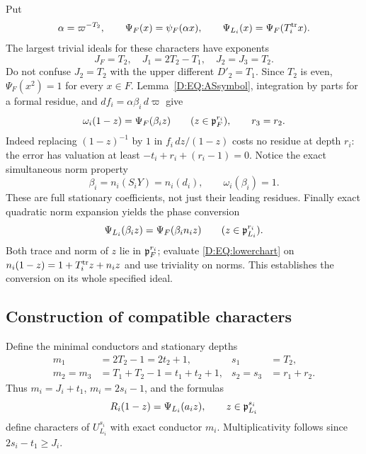 \documentclass[11pt]{amsart}
\theoremstyle{definition}
\theoremstyle{remark}
\begin{document}
Put
\begin{equation}\label{D:EQ:Psis}
 \alpha=\varpi^{-T_2},\qquad
 \Psi_F(x)=\psi_F(\alpha x),\qquad
 \Psi_{L_i}(x)=\Psi_F(T_i^{\rm tr}x).
\end{equation}
The largest trivial ideals for these characters have exponents
\begin{equation}\label{D:EQ:Jledger}
 J_F=T_2,\quad J_1=2T_2-T_1,\quad J_2=J_3=T_2.
\end{equation}
Do not confuse $J_2=T_2$ with the upper different $D'_2=T_1$.
Since $T_2$ is even, $\Psi_F(x^2)=1$ for every $x\in F$.
Lemma~\ref{D:EQ:ASsymbol}, integration by parts for a formal residue, and
$df_i=\alpha\beta_i\,d\varpi$ give
\begin{equation}\label{D:EQ:lowerchart}
 \omega_i(1-z)=\Psi_F(\beta_i z)\qquad(z\in\mathfrak p_F^{r_i}),
 \qquad r_3=r_2.
\end{equation}
Indeed replacing $(1-z)^{-1}$ by $1$ in $f_i\,dz/(1-z)$ costs no
residue at depth $r_i$: the error has valuation at least
$-t_i+r_i+(r_i-1)=0$.
Notice the exact simultaneous norm property
\begin{equation}\label{D:EQ:loweractualnorm}
 \beta_i=n_i(S_iY)=n_i(d_i),\qquad \omega_i(\beta_i)=1.
\end{equation}
These are full stationary coefficients, not just their leading residues.
Finally exact quadratic norm expansion yields the phase conversion
\begin{equation}\label{D:EQ:normphase}
 \Psi_{L_i}(\beta_i z)=\Psi_F(\beta_i n_i z)
                      \qquad(z\in\mathfrak p_{L_i}^{r_i}).
\end{equation}
Both trace and norm of $z$ lie in $\mathfrak p_F^{r_i}$; evaluate
\eqref{D:EQ:lowerchart} on $n_i(1-z)=1+T_i^{\rm tr}z+n_i z$ and use
triviality on norms. This establishes the conversion on its whole
specified ideal.

\subsection{Construction of compatible characters}
Define the minimal conductors and stationary depths
\begin{equation}\label{D:EQ:coreledger}
 \begin{aligned}
 m_1&=2T_2-1=2t_2+1,&s_1&=T_2,\\
 m_2=m_3&=T_1+T_2-1=t_1+t_2+1,&s_2=s_3&=r_1+r_2.
 \end{aligned}
\end{equation}
Thus $m_i=J_i+t_1$, $m_i=2s_i-1$, and the formulas
\begin{equation}\label{D:EQ:Rmodel}
 R_i(1-z)=\Psi_{L_i}(a_i z),\qquad z\in\mathfrak p_{L_i}^{s_i}
\end{equation}
define characters of $U_{L_i}^{s_i}$ with exact conductor $m_i$.
Multiplicativity follows since $2s_i-t_1\ge J_i$.
\end{document}
